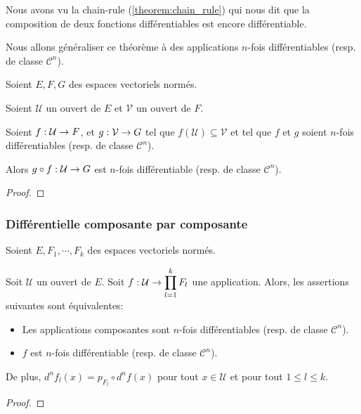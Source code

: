 Nous avons vu la chain-rule (\ref{theorem:chain_rule}) qui nous dit que la
composition de deux fonctions différentiables est encore différentiable.

Nous allons généraliser ce théorème à des applications $n$-fois différentiables
(resp. de classe $\mathcal{C}^{n}$).

\begin{proposition}
	Soient $E, F, G$ des espaces vectoriels normés.

	Soient $\mathcal{U}$ un ouvert de $E$ et $\mathcal{V}$ un ouvert de $F$.

	Soient $f : \mathcal{U} \rightarrow F$, et $g : \mathcal{V} \rightarrow G$
	tel que $f(\mathcal{U}) \subseteq \mathcal{V}$ et tel que $f$ et $g$ soient
	$n$-fois différentiables (resp. de classe $\mathcal{C}^{n}$).

	Alors $g \circ f : \mathcal{U} \rightarrow G$ est $n$-fois différentiable
	(resp. de classe $\mathcal{C}^{n}$).
\end{proposition}

\ifdefined\outputproof
\begin{proof}

\end{proof}
\fi

\subsubsection{Différentielle composante par composante}

Soient $E, F_{1}, \cdots, F_{k}$ des espaces vectoriels normés.

\begin{proposition}
	Soit $\mathcal{U}$ un ouvert de $E$.
	Soit $f : \mathcal{U} \rightarrow \displaystyle \prod_{l = 1}^{k} F_{l}$ une
	application.
	Alors, les assertions suivantes sont équivalentes:

	\begin{itemize}
		\item Les applications composantes sont $n$-fois différentiables (resp.
			de classe $\mathcal{C}^{n}$).
		\item $f$ est $n$-fois différentiable (resp. de classe
			$\mathcal{C}^{n}$).
	\end{itemize}

	De plus, $d^{n}f_{l}(x) = p_{F_{l}} \circ d^{n} f(x)$ pour tout $x \in
	\mathcal{U}$ et pour tout $1 \leq l \leq k$.
\end{proposition}

\ifdefined\outputproof
\begin{proof}

\end{proof}
\fi

